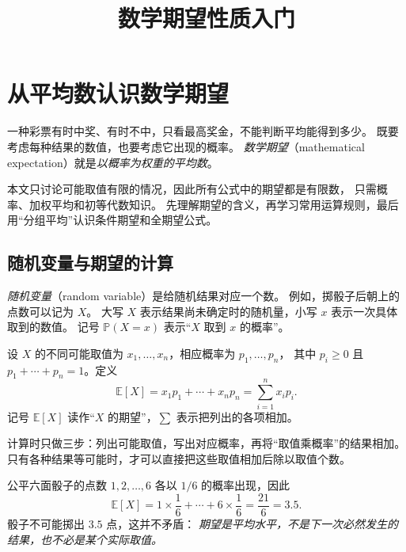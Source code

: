 \documentclass[UTF8,12pt,a4paper,fontset=fandol]{ctexart}
\title{数学期望性质入门}
\author{}
\date{}
\begin{document}
\maketitle

\section{从平均数认识数学期望}
\label{sec:basic-expectation-introduction}

一种彩票有时中奖、有时不中，只看最高奖金，不能判断平均能得到多少。
既要考虑每种结果的数值，也要考虑它出现的概率。
\emph{数学期望}（mathematical expectation）就是\emph{以概率为权重的平均数}。

本文只讨论可能取值有限的情况，因此所有公式中的期望都是有限数，
只需概率、加权平均和初等代数知识。
先理解期望的含义，再学习常用运算规则，最后用“分组平均”认识条件期望和全期望公式。

\subsection{随机变量与期望的计算}

\emph{随机变量}（random variable）是给随机结果对应一个数。
例如，掷骰子后朝上的点数可以记为 $X$。
大写 $X$ 表示结果尚未确定时的随机量，小写 $x$ 表示一次具体取到的数值。
记号 $\mathbb P(X=x)$ 表示“$X$ 取到 $x$ 的概率”。

\begin{definition}[有限个取值时的数学期望]
设 $X$ 的不同可能取值为 $x_1,\ldots,x_n$，相应概率为 $p_1,\ldots,p_n$，
其中 $p_i\geq0$ 且 $p_1+\cdots+p_n=1$。定义
\begin{equation}
  \mathbb E[X]=x_1p_1+\cdots+x_np_n
  =\sum_{i=1}^{n}x_ip_i.
  \label{eq:basic-expectation-definition}
\end{equation}
记号 $\mathbb E[X]$ 读作“$X$ 的期望”，$\sum$ 表示把列出的各项相加。
\end{definition}

计算时只做三步：列出可能取值，写出对应概率，再将“取值乘概率”的结果相加。
只有各种结果等可能时，才可以直接把这些取值相加后除以取值个数。

\begin{example}[公平骰子的点数]
公平六面骰子的点数 $1,2,\ldots,6$ 各以 $1/6$ 的概率出现，因此
\[
  \mathbb E[X]
  =1\times\frac16+\cdots+6\times\frac16
  =\frac{21}{6}=3.5.
\]
骰子不可能掷出 $3.5$ 点，这并不矛盾：
\emph{期望是平均水平，不是下一次必然发生的结果，也不必是某个实际取值。}
\end{example}
\end{document}
